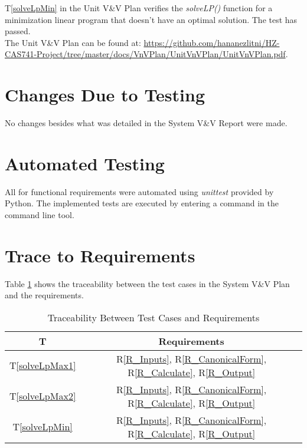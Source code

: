 \documentclass[12pt, titlepage]{article}
\begin{document}
T\ref{solveLpMin} in the Unit V\&V Plan verifies the \textit{solveLP()} 
function for a minimization linear program that doesn't have an optimal 
solution. The test has passed.\\

The Unit V\&V Plan can be found at: 
\url{https://github.com/hananezlitni/HZ-CAS741-Project/tree/master/docs/VnVPlan/UnitVnVPlan/UnitVnVPlan.pdf}.

\section{Changes Due to Testing} \label{ChangesAfterTesting}

No changes besides what was detailed in the System V\&V Report were made.

\section{Automated Testing} \label{AutomatedTest}

All for functional requirements were automated using \textit{unittest} provided 
by Python. The implemented tests are executed by entering a command in the 
command line tool.
		
\section{Trace to Requirements} \label{TraceReq}

Table \ref{Table:ReqTraceability} shows the traceability between the test cases 
in the System V\&V Plan and the requirements.

\begin{table} [h!]
	\centering
	\begin{tabular}{|c|c|}
		\hline	
		\textbf{T} & \textbf{Requirements}\\
		\hline 
		T\ref{solveLpMax1}& R\ref{R_Inputs}, R\ref{R_CanonicalForm}, 
		R\ref{R_Calculate}, R\ref{R_Output}\\ \hline
		T\ref{solveLpMax2}& R\ref{R_Inputs}, R\ref{R_CanonicalForm}, 
		R\ref{R_Calculate}, R\ref{R_Output}\\ \hline
		T\ref{solveLpMin}& R\ref{R_Inputs}, R\ref{R_CanonicalForm}, 
		R\ref{R_Calculate}, R\ref{R_Output}\\ \hline
	\end{tabular}
	\caption{Traceability Between Test Cases and Requirements}
	\label{Table:ReqTraceability} 
\end{table}
		
\end{document}
